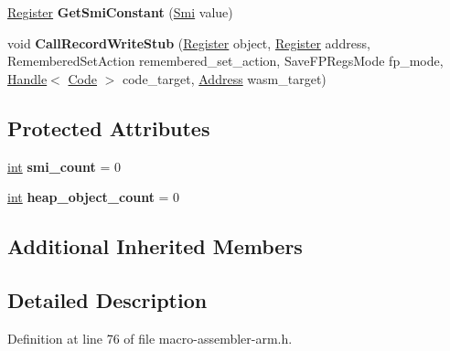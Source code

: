\begin{DoxyCompactItemize}
\mbox{\hyperlink{classv8_1_1internal_1_1Register}{Register}} {\bfseries Get\+Smi\+Constant} (\mbox{\hyperlink{classv8_1_1internal_1_1Smi}{Smi}} value)
\item 
\mbox{\label{classv8_1_1internal_1_1TurboAssembler_a79a934c4dffec4c2148ff244228b99d3}} 
void {\bfseries Call\+Record\+Write\+Stub} (\mbox{\hyperlink{classv8_1_1internal_1_1Register}{Register}} object, \mbox{\hyperlink{classv8_1_1internal_1_1Register}{Register}} address, Remembered\+Set\+Action remembered\+\_\+set\+\_\+action, Save\+F\+P\+Regs\+Mode fp\+\_\+mode, \mbox{\hyperlink{classv8_1_1internal_1_1Handle}{Handle}}$<$ \mbox{\hyperlink{classv8_1_1internal_1_1Code}{Code}} $>$ code\+\_\+target, \mbox{\hyperlink{classuintptr__t}{Address}} wasm\+\_\+target)
\end{DoxyCompactItemize}
\subsection*{Protected Attributes}
\begin{DoxyCompactItemize}
\item 
\mbox{\label{classv8_1_1internal_1_1TurboAssembler_a0bce9be6771544ff7888bf1a3885fd3d}} 
\mbox{\hyperlink{classint}{int}} {\bfseries smi\+\_\+count} = 0
\item 
\mbox{\label{classv8_1_1internal_1_1TurboAssembler_a47021b13767e6d01eb3922c07a0448c1}} 
\mbox{\hyperlink{classint}{int}} {\bfseries heap\+\_\+object\+\_\+count} = 0
\end{DoxyCompactItemize}
\subsection*{Additional Inherited Members}


\subsection{Detailed Description}


Definition at line 76 of file macro-\/assembler-\/arm.\+h.



